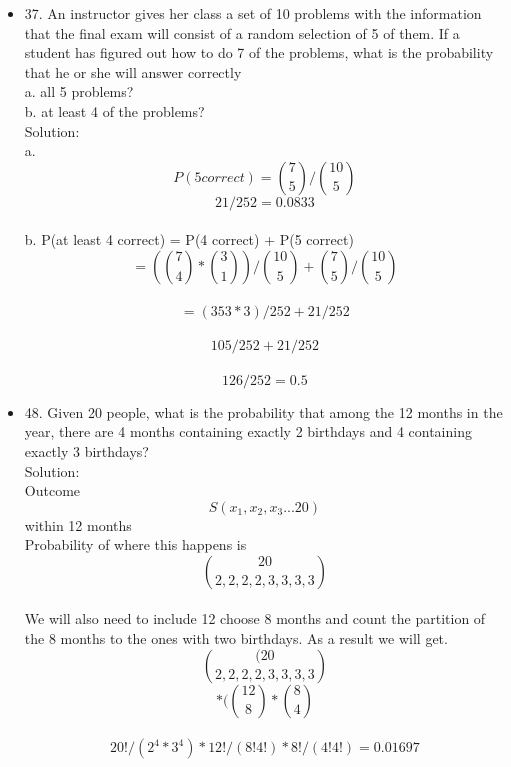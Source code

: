 \documentclass{article}
\begin{document}
\begin{itemize}
    \\Solution:
    \\Probability of Winning craps given the rules, where n is the outcome: $$\sum_{n=1}^{\infty}P(E_n)$$
    $$\sum_{n=1}^{\infty}P(E_2) = 0$$
    $$\sum_{n=1}^{\infty}P(E_3) = 0$$
    $$\sum_{n=3}^{\infty}P(E_4) = 3/36 * 0 *(3/36)^2 + 27/36*(3/36)^2 + (27/36)^2+3/36.... \infty$$
    $$\sum_{n=1}^{\infty}P(E_4) = 1/36$$
    $$\sum_{n=1}^{\infty}P(E_5) = 4/36 * 0 *(4/36)^2 + 26/36*(4/36)^2 + (26/36)^2+4/36.... \infty$$
    $$\sum_{n=1}^{\infty}P(E_5) = 2/45$$
    $$\sum_{n=1}^{\infty}P(E_6) = 5/36 * 0 *(5/36)^2 + 25/36*(5/36)^2 + (25/36)^2+5/36.... \infty$$
    $$\sum_{n=1}^{\infty}P(E_6) = 25/396$$
    $$\sum_{n=1}^{\infty}P(E_7) = 6/36 * 0 *(6/36)^2 + 24/36*(6/36)^2 + (24/36)^2+6/36.... \infty$$
    $$\sum_{n=1}^{\infty}P(E_7) = 6/36$$
    This rule is the same for the rest of the outcomes.
    $$\sum_{n=1}^{\infty}P(E_8) = 25/396$$
    $$\sum_{n=1}^{\infty}P(E_9) = 6/36$$
    $$\sum_{n=1}^{\infty}P(E_{10}) = 1/36$$
    $$\sum_{n=1}^{\infty}P(E_{11}) = 2/36$$
    $$\sum_{n=1}^{\infty}P(E_{12}) = 0$$
    As a result this probability is...$$\sum_{n=2}^{12}P(E_n) = (0 + 0 + 1/36 + 2/45 + 25/396 + 6/36 + 25/396 + 2/36 + 1/36 + 2/36 + 0)$$
    $$=0.492929$$
    \item37. An instructor gives her class a set of 10 problems with the information that the final exam will consist of a random selection of 5 of them. If a student has figured out how to do 7 of the problems, what is the probability that he or she will answer correctly
    \\a. all 5 problems?
    \\b. at least 4 of the problems?
    \\Solution: 
    \\a. $$P(5 correct) = {7 \choose 5}/{10\choose 5}$$
    $$ 21/252 = 0.0833$$
    \\b. P(at least 4 correct) = P(4 correct) + P(5 correct)
    \\$$=({7 \choose 4} * {3 \choose 1})/{10 \choose 5} + {7 \choose 5}/{10 \choose 5}$$
    \\$$= (353 *3)/252 + 21/252$$
    \\$$105/252 + 21/252$$
    \\$$126/252 = 0.5$$
    \item 48. Given 20 people, what is the probability that among the 12 months in the year, there are 4 months containing exactly 2 birthdays and 4 containing exactly 3 birthdays?
    \\Solution:
    \\Outcome $$S(x_1,x_2,x_3 ... 20)$$ within 12 months
    \\Probability of where this happens is $$20 \choose {2, 2, 2, 2, 3, 3, 3, 3}$$
    \\We will also need to include 12 choose 8 months and count the partition of the 8 months to the ones with two birthdays. As a result we will get.
    \\$$(20 \choose {2, 2, 2, 2, 3, 3, 3, 3}$$$$ * ({12 \choose 8} * {8 \choose 4}$$
    \\$$20!/(2^4 * 3^4) * 12!/(8!4!)*8!/(4!4!) = 0.01697$$
\end{itemize}
\end{document}
